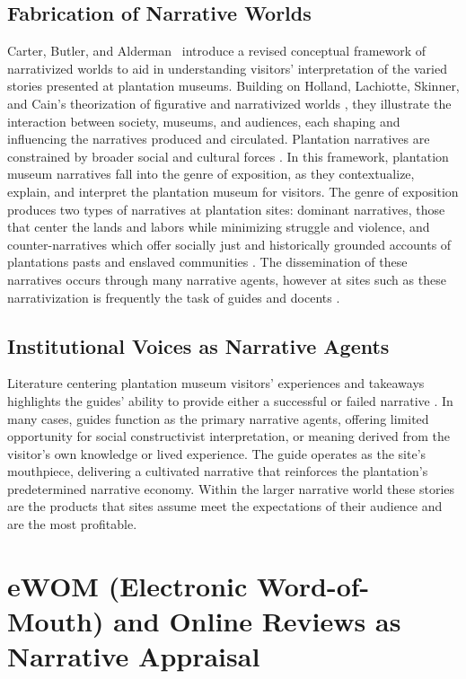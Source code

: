 \documentclass[final]{anthology-ch} %
\begin{document}
\subsection{Fabrication of Narrative Worlds}

Carter, Butler, and Alderman~\cite{carter2014house} introduce a revised conceptual framework of narrativized worlds to aid in understanding visitors' interpretation of the varied stories presented at plantation museums. Building on Holland, Lachiotte, Skinner, and Cain's theorization of figurative and narrativized worlds \cite{holland2001identity}, they illustrate the interaction between society, museums, and audiences, each shaping and influencing the narratives produced and circulated. Plantation narratives are constrained by broader social and cultural forces \cite{carter2014house}. In this framework, plantation museum narratives fall into the genre of exposition, as they contextualize, explain, and interpret the plantation museum for visitors. The genre of exposition produces two types of narratives at plantation sites: dominant narratives, those that center the lands and labors while minimizing struggle and violence, and counter-narratives which offer socially just and historically grounded accounts of plantations pasts and enslaved communities \cite{carter2016where, cook2016counter}. The dissemination of these narratives occurs through many narrative agents, however at sites such as these narrativization is frequently the task of guides and docents \cite{modlin2008tales}.

\subsection{Institutional Voices as Narrative Agents}

Literature centering plantation museum visitors' experiences and takeaways highlights the guides' ability to provide either a successful or failed narrative \cite{carter2016where}. In many cases, guides function as the primary narrative agents, offering limited opportunity for social constructivist interpretation, or meaning derived from the visitor's own knowledge or lived experience. The guide operates as the site's mouthpiece, delivering a cultivated narrative that reinforces the plantation's predetermined narrative economy. Within the larger narrative world these stories are the products that sites assume meet the expectations of their audience and are the most profitable.

\section{eWOM (Electronic Word-of-Mouth) and Online Reviews as Narrative Appraisal}
\end{document}
